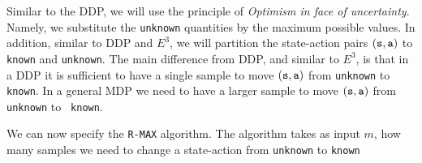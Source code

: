 Similar to the DDP, we will use the principle of {\em Optimism in
face of uncertainty}. Namely, we substitute the \texttt{unknown} quantities
by the maximum possible values.
%
In addition, similar to DDP and $E^3$, we will partition the
state-action pairs $({\tt s},{\tt a})$ to \texttt{known} and \texttt{unknown}.
%
The main difference from DDP, and similar to $E^3$, is that in a DDP
it is sufficient to have a single sample to move $({\tt s},{\tt a})$
from \texttt{unknown} to \texttt{known}. In a general MDP we need to have a
larger sample to move $({\tt s},{\tt a})$ from \texttt{unknown} to {\tt
known}. 

We can now specify the {\tt R-MAX} algorithm. The algorithm takes as input $m$, how many
samples we need to change a state-action from \texttt{unknown} to \texttt{known}





